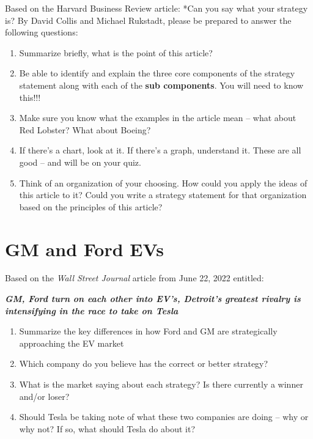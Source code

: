 \documentclass[
]{book}
\providecommand{\tightlist}{%
  \setlength{\itemsep}{0pt}\setlength{\parskip}{0pt}}
\begin{document}
Based on the Harvard Business Review article: *Can you say what your strategy is? By David Collis and Michael Rukstadt, please be prepared to answer the following questions:

\begin{enumerate}
\def\labelenumi{\arabic{enumi}.}
\item
  Summarize briefly, what is the point of this article?\\
\item
  Be able to identify and explain the three core components of the strategy statement along with each of the \textbf{sub components}. You will need to know this!!!
\item
  Make sure you know what the examples in the article mean -- what about Red Lobster? What about Boeing?
\item
  If there's a chart, look at it. If there's a graph, understand it. These are all good -- and will be on your quiz.
\item
  Think of an organization of your choosing. How could you apply the ideas of this article to it? Could you write a strategy statement for that organization based on the principles of this article?
\end{enumerate}

\hypertarget{gm-and-ford-evs}{%
\chapter{GM and Ford EVs}\label{gm-and-ford-evs}}

Based on the \emph{Wall Street Journal} article from June 22, 2022 entitled:

\textbf{\emph{GM, Ford turn on each other into EV's, Detroit's greatest rivalry is intensifying in the race to take on Tesla}}

\begin{enumerate}
\def\labelenumi{\arabic{enumi}.}
\tightlist
\item
  Summarize the key differences in how Ford and GM are strategically approaching the EV market
\item
  Which company do you believe has the correct or better strategy?
\item
  What is the market saying about each strategy? Is there currently a winner and/or loser?
\item
  Should Tesla be taking note of what these two companies are doing -- why or why not? If so, what should Tesla do about it?
\end{enumerate}
\end{document}

